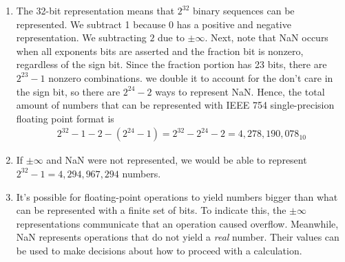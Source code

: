 \documentclass[12pt]{article}
\newenvironment{sol}[1][Solution]{\begin{trivlist}
		\item[\hskip \labelsep {\bfseries #1:}]}{\end{trivlist}}
\begin{document}
\begin{sol}
	\begin{enumerate}[label=(\alph*)]
		\item The 32-bit representation  means that $2^{32}$ binary sequences can be
		represented. We subtract 1 because $0$ has a positive and negative representation.
		We subtracting $2$ due to $\pm \infty$. Next, note that NaN occurs when
		all exponents bits are asserted and the fraction bit is nonzero, regardless
		of the sign bit. Since the fraction portion has 23 bits, there are $2^{23}-1$
		nonzero combinations. we double it to account for the don't care in the sign
		bit, so there are $2^{24}-2$ ways to represent NaN. Hence, the total amount
		of numbers that can be represented with IEEE 754 single-precision floating point
		format is
		\begin{align*}
			2^{32}-1-2-(2^{24}-1)=2^{32}-2^{24}-2=4,278,190,078_{10}
		\end{align*}
		\item If $\pm \infty$ and NaN were not represented, we would be able to
		represent $2^{32}-1=4,294,967,294$ numbers.
		\item It's possible for floating-point operations to yield numbers bigger than
		what can be represented with a finite set of bits. To indicate this, the
		$\pm\infty$ representations communicate that an operation caused overflow. 
		Meanwhile, NaN represents operations that do not yield a \emph{real} number.
		Their values can be used to make decisions about how to proceed with a
		calculation.
	\end{enumerate}
\end{sol}
\end{document}
